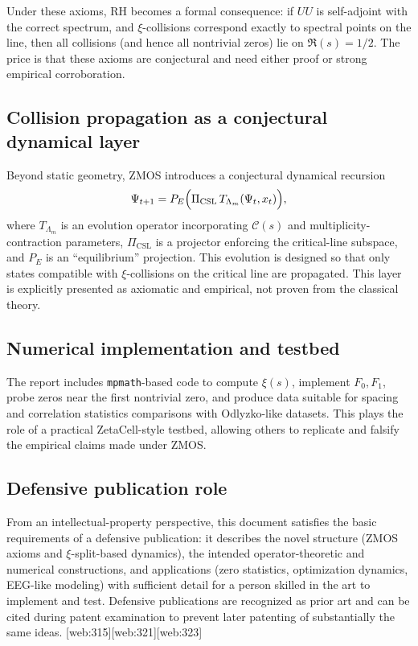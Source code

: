 \documentclass[11pt]{article}
\begin{document}
Under these axioms, RH becomes a formal consequence: if $UU$ is self-adjoint with the correct spectrum, and $\xi$-collisions correspond exactly to spectral points on the line, then all collisions (and hence all nontrivial zeros) lie on $\Re(s)=1/2$.  The price is that these axioms are conjectural and need either proof or strong empirical corroboration.

\subsection{Collision propagation as a conjectural dynamical layer}

Beyond static geometry, ZMOS introduces a conjectural dynamical recursion
\begin{equation}
  \Psi_{t+1} = P_E\Bigl( \Pi_{\mathrm{CSL}} \, T_{\Lambda_m}(\Psi_t, x_t) \Bigr),
\end{equation}
where $T_{\Lambda_m}$ is an evolution operator incorporating $\mathcal{C}(s)$ and multiplicity-contraction parameters, $\Pi_{\mathrm{CSL}}$ is a projector enforcing the critical-line subspace, and $P_E$ is an ``equilibrium'' projection.  This evolution is designed so that only states compatible with $\xi$-collisions on the critical line are propagated.  This layer is explicitly presented as axiomatic and empirical, not proven from the classical theory.

\subsection{Numerical implementation and testbed}

The report includes \texttt{mpmath}-based code to compute $\xi(s)$, implement $F_0,F_1$, probe zeros near the first nontrivial zero, and produce data suitable for spacing and correlation statistics comparisons with Odlyzko-like datasets.  This plays the role of a practical ZetaCell-style testbed, allowing others to replicate and falsify the empirical claims made under ZMOS.

\subsection{Defensive publication role}

From an intellectual-property perspective, this document satisfies the basic requirements of a defensive publication: it describes the novel structure (ZMOS axioms and $\xi$-split-based dynamics), the intended operator-theoretic and numerical constructions, and applications (zero statistics, optimization dynamics, EEG-like modeling) with sufficient detail for a person skilled in the art to implement and test.  Defensive publications are recognized as prior art and can be cited during patent examination to prevent later patenting of substantially the same ideas. [web:315][web:321][web:323]
\end{document}
